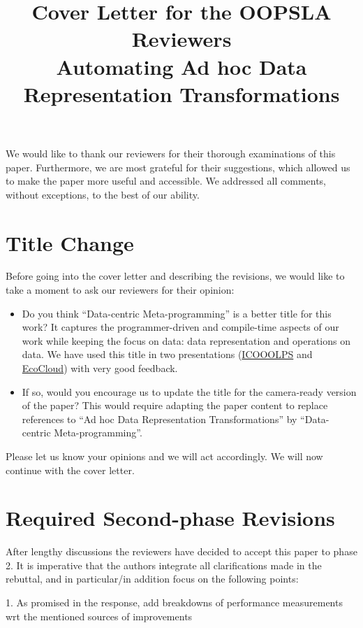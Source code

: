 \documentclass[9pt]{article}
\newenvironment{editorial}
{ \color{Red} \framebox{{\bf REVISION}} }
{  }
\begin{document}
\title{Cover Letter for the OOPSLA Reviewers\\\Large Automating Ad hoc Data Representation Transformations}
\maketitle

We would like to thank our reviewers for their thorough examinations of this paper. Furthermore, we are most grateful for their suggestions, which allowed us to make the paper more useful and accessible. We addressed all comments, without exceptions, to the best of our ability.

\section{Title Change}

Before going into the cover letter and describing the revisions, we would like to take a moment to ask our reviewers for their opinion:

\begin{itemize}
  \item Do you think ``Data-centric Meta-programming'' is a better title for this work? It captures the programmer-driven and compile-time aspects of our work while keeping the focus on data: data representation and operations on data. We have used this title in two presentations (\href{https://speakerdeck.com/vladureche/data-centric-metaprogramming-at-icooolps-2015}{ICOOOLPS} and \href{https://speakerdeck.com/vladureche/data-centric-metaprogramming-at-ecocloud-2015}{EcoCloud}) with very good feedback.
  \item If so, would you encourage us to update the title for the camera-ready version of the paper? This would require adapting the paper content to replace references to ``Ad hoc Data Representation Transformations'' by ``Data-centric Meta-programming''.
\end{itemize}

Please let us know your opinions and we will act accordingly. We will now continue with the cover letter.

\section{Required Second-phase Revisions}


\begin{editorial}
After lengthy discussions the reviewers have decided to accept this paper to phase 2. It is imperative that the authors integrate all clarifications made in the rebuttal, and in particular/in addition focus on the following points:

1. As promised in the response, add breakdowns of performance measurements wrt the mentioned sources of improvements
\end{editorial}
\end{document}
